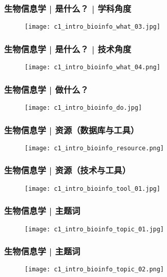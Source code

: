 \begin{frame}
  \frametitle{生物信息学 | 是什么？ | \alert{学科角度}}
  \begin{figure}
    \centering
    \texttt{[image: c1\_intro\_bioinfo\_what\_03.jpg]}
  \end{figure}
\end{frame}

\begin{frame}
  \frametitle{生物信息学 | 是什么？ | \alert{技术角度}}
  \begin{figure}
    \centering
    \texttt{[image: c1\_intro\_bioinfo\_what\_04.png]}
  \end{figure}
\end{frame}

\begin{frame}
  \frametitle{生物信息学 | \alert{做什么？}}
  \begin{figure}
    \centering
    \texttt{[image: c1\_intro\_bioinfo\_do.jpg]}
  \end{figure}
\end{frame}

\begin{frame}
  \frametitle{生物信息学 | 资源（数据库与工具）}
  \begin{figure}
    \centering
    \texttt{[image: c1\_intro\_bioinfo\_resource.png]}
  \end{figure}
\end{frame}

\begin{frame}
  \frametitle{生物信息学 | 资源（技术与工具）}
  \begin{figure}
    \centering
    \texttt{[image: c1\_intro\_bioinfo\_tool\_01.jpg]}
  \end{figure}
\end{frame}

\begin{frame}
  \frametitle{生物信息学 | 主题词}
  \begin{figure}
    \centering
    \texttt{[image: c1\_intro\_bioinfo\_topic\_01.jpg]}
  \end{figure}
\end{frame}

\begin{frame}
  \frametitle{生物信息学 | 主题词}
  \begin{figure}
    \centering
    \texttt{[image: c1\_intro\_bioinfo\_topic\_02.png]}
  \end{figure}
\end{frame}

